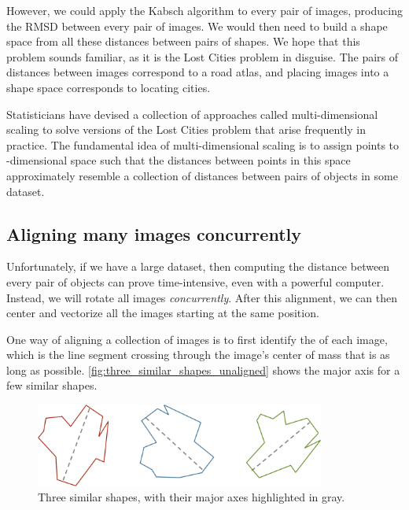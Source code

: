 However, we could apply the Kabsch algorithm to every pair of images, producing the RMSD between every pair of images. We would then need to build a shape space from all these distances between pairs of shapes. We hope that this problem sounds familiar, as it is the Lost Cities problem in disguise. The pairs of distances between images correspond to a road atlas, and placing images into a shape space corresponds to locating cities.

Statisticians have devised a collection of approaches called multi-dimensional scaling to solve versions of the Lost Cities problem that arise frequently in practice. The fundamental idea of multi-dimensional scaling is to assign points to -dimensional space such that the distances between points in this space approximately resemble a collection of distances between pairs of objects in some dataset.\\

\begin{qbox}\end{qbox}

\FloatBarrier
{}
\subsection{Aligning many images concurrently}

Unfortunately, if we have a large dataset, then computing the distance between every pair of objects can prove time-intensive, even with a powerful computer. Instead, we will rotate all images \textit{concurrently}. After this alignment, we can then center and vectorize all the images starting at the same position.

One way of aligning a collection of images is to first identify the  of each image, which is the line segment crossing through the image's center of mass that is as long as possible. \autoref{fig:three_similar_shapes_unaligned} shows the major axis for a few similar shapes.\\

\begin{figure}[h]
\centering
\mySfFamily
\includegraphics[width = 0.85\textwidth]{../images/three_similar_shapes_unaligned.png}
\caption{Three similar shapes, with their major axes highlighted in gray.}
\label{fig:three_similar_shapes_unaligned}
\end{figure}


